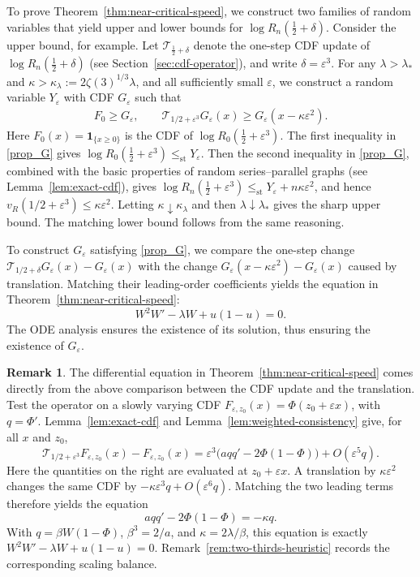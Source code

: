 \documentclass[12pt,preprint]{amsart}
\numberwithin{equation}{section}
\theoremstyle{plain}
\theoremstyle{definition}
\newtheorem{remark}[theorem]{Remark}
\newcommand{\stle}{\le_{\mathrm{st}}}
\begin{document}
To prove Theorem~\ref{thm:near-critical-speed}, we construct two families of random variables that yield upper and lower bounds for $\log R_n(\frac12+\delta)$. Consider the upper bound, for example. Let $\mathcal T_{\frac12+\delta}$ denote the one-step CDF
update of $\log R_n(\frac12+\delta)$ (see Section~\ref{sec:cdf-operator}), and write $\delta=\varepsilon^3$. For any
\(\lambda>\lambda_*\) and
\(\kappa>\kappa_\lambda:=2\zeta(3)^{1/3}\lambda\), and all sufficiently
small \(\varepsilon\), we construct a random variable
\(Y_\varepsilon\) with CDF \(G_\varepsilon\) such that
\begin{align}\label{prop_G}
 F_0\ge G_\varepsilon,
 \qquad
 \mathcal T_{1/2+\varepsilon^3}G_\varepsilon(x)
 \ge G_\varepsilon(x-\kappa\varepsilon^2).
\end{align}
Here $F_0(x)=\mathbf 1_{\{x\ge0\}}$ is the CDF of $\log R_0(\frac12+\varepsilon^3)$. The first inequality in \eqref{prop_G} gives $\log R_0(\frac12+\varepsilon^3)
 \stle Y_\varepsilon$. Then the second inequality in \eqref{prop_G}, combined with the basic properties of random series--parallel graphs (see Lemma~\ref{lem:exact-cdf}), gives
  $\log R_n(\frac12+\varepsilon^3)
 \stle Y_\varepsilon+n\kappa\varepsilon^2$, and hence
\(v_R(1/2+\varepsilon^3)\le\kappa\varepsilon^2\).
Letting \(\kappa\downarrow\kappa_\lambda\) and then
\(\lambda\downarrow\lambda_*\) gives the sharp upper bound. The matching
lower bound follows from the same reasoning.

To construct \(G_\varepsilon\) satisfying \eqref{prop_G}, we compare the  one-step change
\(\mathcal T_{1/2+\delta}G_\varepsilon(x)-G_\varepsilon(x)\) with the change
\(G_\varepsilon(x-\kappa\varepsilon^2)-G_\varepsilon(x)\) caused by translation.
 Matching their leading-order coefficients yields the
equation in Theorem~\ref{thm:near-critical-speed}:
\[
 W^2W'-\lambda W+u(1-u)=0.
\]
The ODE analysis
ensures the existence of its solution, thus ensuring the existence of $G_\varepsilon$.



\begin{remark}
    The differential equation in Theorem~\ref{thm:near-critical-speed} comes
directly from the above comparison between the CDF update and the translation. Test the operator on a slowly varying CDF
$F_{\varepsilon,z_0}(x)=\Phi(z_0+\varepsilon x)$, with
$q=\Phi'$.  Lemma~\ref{lem:exact-cdf} and
Lemma~\ref{lem:weighted-consistency} give, for all $x$ and $z_0$,
\[
 \mathcal T_{1/2+\varepsilon^3}F_{\varepsilon,z_0}(x)
 -F_{\varepsilon,z_0}(x)
 =\varepsilon^3\bigl(a q q'-2\Phi(1-\Phi)\bigr)
  +O(\varepsilon^5q).
\]
Here the quantities on the right are evaluated at
$z_0+\varepsilon x$.
A translation by $\kappa\varepsilon^2$ changes the same CDF by
$-\kappa\varepsilon^3q+O(\varepsilon^6q)$.  Matching the two leading terms
therefore yields the  equation
\[
 a q q'-2\Phi(1-\Phi)=-\kappa q.
\]
With $q=\beta W(1-\Phi)$, $\beta^3=2/a$, and
$\kappa=2\lambda/\beta$, this equation is exactly
$W^2W'-\lambda W+u(1-u)=0$.   Remark~\ref{rem:two-thirds-heuristic} records the corresponding
scaling balance.

\end{remark}
\end{document}
